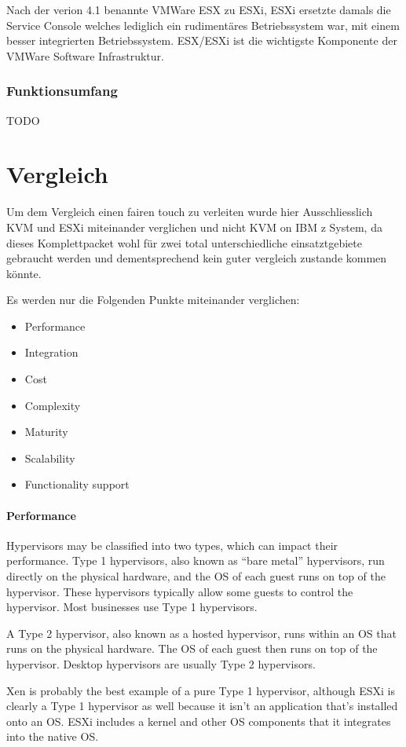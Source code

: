 \documentclass[14pt]{extreport}
\begin{document}
Nach der verion 4.1 benannte VMWare ESX zu ESXi, ESXi ersetzte damals die Service Console welches lediglich ein rudimentäres Betriebssystem war, mit einem besser integrierten Betriebssystem. ESX/ESXi ist die wichtigste Komponente der VMWare Software Infrastruktur.

\subsection{Funktionsumfang}
TODO

\chapter{Vergleich}
Um dem Vergleich einen fairen touch zu verleiten wurde hier Ausschliesslich KVM und ESXi miteinander verglichen und nicht KVM on IBM z System, da dieses Komplettpacket wohl für zwei total unterschiedliche einsatztgebiete gebraucht werden und dementsprechend kein guter vergleich zustande kommen könnte.

Es werden nur die Folgenden Punkte miteinander verglichen:
\begin{itemize}
	\item	Performance
	\item	Integration
	\item	Cost
	\item	Complexity
	\item	Maturity
	\item	Scalability
	\item	Functionality support
\end{itemize}


\subsubsection{Performance}

Hypervisors may be classified into two types, which can impact their performance. Type 1 hypervisors, also known as “bare metal” hypervisors, run directly on the physical hardware, and the OS of each guest runs on top of the hypervisor. These hypervisors typically allow some guests to control the hypervisor. Most businesses use Type 1 hypervisors.

A Type 2 hypervisor, also known as a hosted hypervisor, runs within an OS that runs on the physical hardware. The OS of each guest then runs on top of the hypervisor. Desktop hypervisors are usually Type 2 hypervisors.

Xen is probably the best example of a pure Type 1 hypervisor, although ESXi is clearly a Type 1 hypervisor as well because it isn’t an application that’s installed onto an OS. ESXi includes a kernel and other OS components that it integrates into the native OS.
\end{document}

